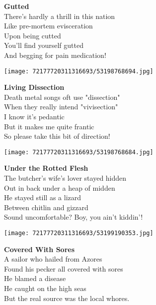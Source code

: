 \documentclass[10pt,letterpaper]{article}
\begin{document}
\begin{center}
\textbf{Gutted}\\
\vskip 0.2in
There's hardly a thrill in this nation\\
Like pre-mortem evisceration\\
Upon being cutted\\
You'll find yourself gutted\\
And begging for pain medication!\\
\end{center}
\pagebreak

\begin{center}
\texttt{[image: 72177720311316693/53198768694.jpg]}
\end{center}

\begin{center}
\textbf{Living Dissection}\\
\vskip 0.2in
Death metal songs oft use "dissection"\\
When they really intend "vivisection"\\
I know it's pedantic\\
But it makes me quite frantic\\
So please take this bit of direction!\\
\end{center}
\pagebreak

\begin{center}\texttt{[image: 72177720311316693/53198768684.jpg]}
\end{center}
\begin{center}
\textbf{Under the Rotted Flesh}\\
\vskip 0.2in
The butcher's wife's lover stayed hidden\\
Out in back under a heap of midden\\
He stayed still as a lizard\\
Between chitlin and gizzard\\
Sound uncomfortable?  Boy, you ain't kiddin'!\\
\end{center}
\pagebreak

\begin{center}\texttt{[image: 72177720311316693/53199190353.jpg]}
\end{center}
\begin{center}
\textbf{Covered With Sores}\\
\vskip 0.2in
A sailor who hailed from Azores\\
Found his pecker all covered with sores\\
He blamed a disease\\
He caught on the high seas\\
But the real source was the local whores.\\
\end{center}
\pagebreak
\end{document}

